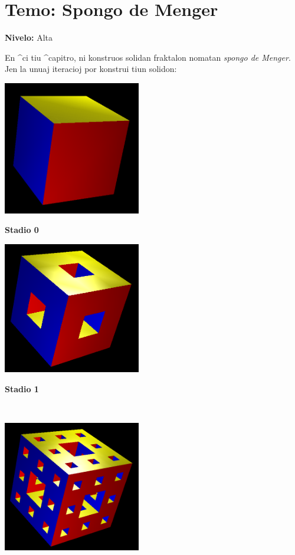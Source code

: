 \chapter{Temo:  Spongo de Menger}

{ }\hfill\textbf{Nivelo:} Alta

En ^ci tiu ^capitro, ni konstruos solidan fraktalon nomatan
\emph{spongo de Menger}.  Jen la unuaj iteracioj por konstrui tiun
solidon:

\begin{center}
  \begin{minipage}{6cm}
    \includegraphics[width=6cm]{bildoj/menger0.png}
    \begin{center}
      \textbf{Stadio 0}
    \end{center}
  \end{minipage}
  \begin{minipage}{6cm}
    \includegraphics[width=6cm]{bildoj/menger1.png}
    \begin{center}
      \textbf{Stadio 1}
    \end{center}
  \end{minipage}
  \\
  \begin{minipage}{6cm}
    \includegraphics[width=6cm]{bildoj/menger2.png}

\end{minipage}
\end{center}
